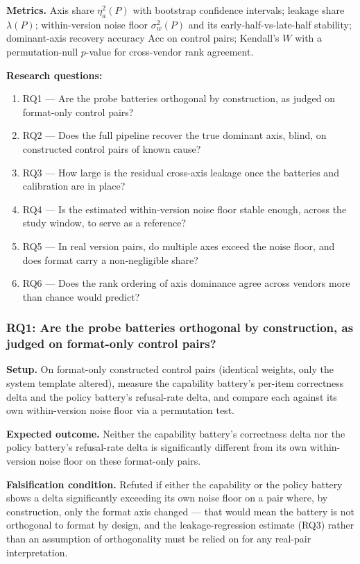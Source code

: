 \documentclass[11pt]{article}
\begin{document}
\textbf{Metrics.} Axis share $\eta^2_a(P)$ with bootstrap confidence intervals; leakage share $\lambda(P)$; within-version noise floor $\sigma^2_w(P)$ and its early-half-vs-late-half stability; dominant-axis recovery accuracy $\mathrm{Acc}$ on control pairs; Kendall's $W$ with a permutation-null $p$-value for cross-vendor rank agreement.

\textbf{Research questions:}
\begin{enumerate}[leftmargin=1.6em]
\item RQ1 --- Are the probe batteries orthogonal by construction, as judged on format-only control pairs?
\item RQ2 --- Does the full pipeline recover the true dominant axis, blind, on constructed control pairs of known cause?
\item RQ3 --- How large is the residual cross-axis leakage once the batteries and calibration are in place?
\item RQ4 --- Is the estimated within-version noise floor stable enough, across the study window, to serve as a reference?
\item RQ5 --- In real version pairs, do multiple axes exceed the noise floor, and does format carry a non-negligible share?
\item RQ6 --- Does the rank ordering of axis dominance agree across vendors more than chance would predict?
\end{enumerate}

\subsubsection{RQ1: Are the probe batteries orthogonal by construction, as judged on format-only control pairs?}
\textbf{Setup.} On format-only constructed control pairs (identical weights, only the system template altered), measure the capability battery's per-item correctness delta and the policy battery's refusal-rate delta, and compare each against its own within-version noise floor via a permutation test.

\textbf{Expected outcome.} Neither the capability battery's correctness delta nor the policy battery's refusal-rate delta is significantly different from its own within-version noise floor on these format-only pairs.

\textbf{Falsification condition.} Refuted if either the capability or the policy battery shows a delta significantly exceeding its own noise floor on a pair where, by construction, only the format axis changed --- that would mean the battery is not orthogonal to format by design, and the leakage-regression estimate (RQ3) rather than an assumption of orthogonality must be relied on for any real-pair interpretation.
\end{document}
